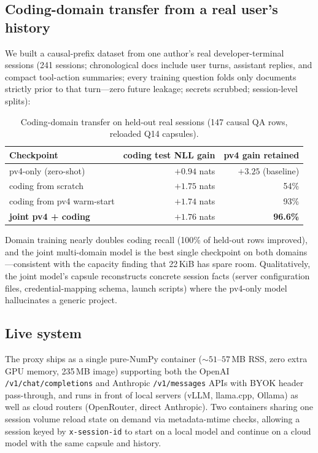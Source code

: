 \documentclass[11pt]{article}
\begin{document}
\subsection{Coding-domain transfer from a real user's history}
\label{sec:coding}
We built a causal-prefix dataset from one author's real
developer-terminal sessions (241 sessions; chronological docs include
user turns, assistant replies, and compact tool-action summaries;
every training question folds only documents strictly prior to that
turn---zero future leakage; secrets scrubbed; session-level splits):
\begin{table}[ht]
\centering
\caption{Coding-domain transfer on held-out real sessions (147 causal QA rows, reloaded Q14 capsules).}
\label{tab:coding}
\begin{tabular}{lrr}
\toprule
Checkpoint & coding test NLL gain & pv4 gain retained\\
\midrule
pv4-only (zero-shot) & $+0.94$ nats & $+3.25$ (baseline)\\
coding from scratch & $+1.75$ nats & 54\%\\
coding from pv4 warm-start & $+1.74$ nats & 93\%\\
\textbf{joint pv4 + coding} & $\mathbf{+1.76}$ nats & \textbf{96.6\%}\\
\bottomrule
\end{tabular}
\end{table}
Domain training nearly doubles coding recall (100\% of held-out rows
improved), and the joint multi-domain model is the best single
checkpoint on both domains---consistent with the capacity finding that
22\,KiB has spare room. Qualitatively, the joint model's capsule
reconstructs concrete session facts (server configuration files,
credential-mapping schema, launch scripts) where the pv4-only model
hallucinates a generic project.

\subsection{Live system}
\label{sec:live}
The proxy ships as a single pure-NumPy container (${\sim}51$--$57$\,MB
RSS, zero extra GPU memory, 235\,MB image) supporting both the OpenAI
\texttt{/v1/chat/completions} and Anthropic \texttt{/v1/messages} APIs
with BYOK header pass-through, and runs in front of local servers
(vLLM, llama.cpp, Ollama) as well as cloud routers (OpenRouter, direct
Anthropic). Two containers sharing one session volume reload state on
demand via metadata-mtime checks, allowing a session keyed by
\texttt{x-session-id} to start on a local model and continue on a cloud
model with the same capsule and history.
\end{document}
